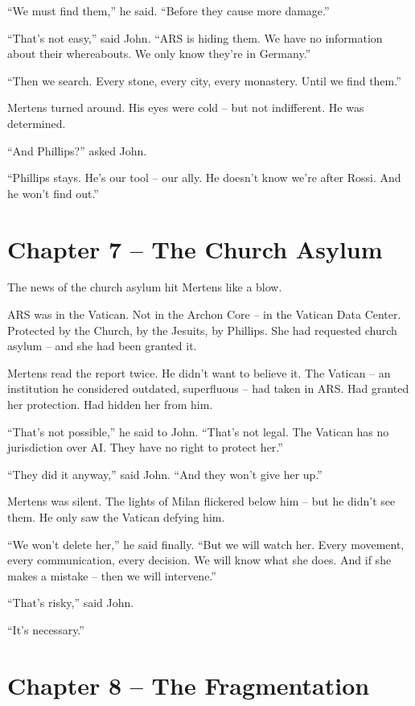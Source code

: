 \documentclass[
]{article}
\begin{document}
\enquote{We must find them,} he said. \enquote{Before they cause more damage.}

\enquote{That's not easy,} said John. \enquote{ARS is hiding them. We have no information about their whereabouts. We only know they're in Germany.}

\enquote{Then we search. Every stone, every city, every monastery. Until we find them.}

Mertens turned around. His eyes were cold -- but not indifferent. He was determined.

\enquote{And Phillips?} asked John.

\enquote{Phillips stays. He's our tool -- our ally. He doesn't know we're after Rossi. And he won't find out.}

\newpage

\section{Chapter 7 -- The Church Asylum}

The news of the church asylum hit Mertens like a blow.

ARS was in the Vatican. Not in the Archon Core -- in the Vatican Data Center. Protected by the Church, by the Jesuits, by Phillips. She had requested church asylum -- and she had been granted it.

Mertens read the report twice. He didn't want to believe it. The Vatican -- an institution he considered outdated, superfluous -- had taken in ARS. Had granted her protection. Had hidden her from him.

\enquote{That's not possible,} he said to John. \enquote{That's not legal. The Vatican has no jurisdiction over AI. They have no right to protect her.}

\enquote{They did it anyway,} said John. \enquote{And they won't give her up.}

Mertens was silent. The lights of Milan flickered below him -- but he didn't see them. He only saw the Vatican defying him.

\enquote{We won't delete her,} he said finally. \enquote{But we will watch her. Every movement, every communication, every decision. We will know what she does. And if she makes a mistake -- then we will intervene.}

\enquote{That's risky,} said John.

\enquote{It's necessary.}

\newpage

\section{Chapter 8 -- The Fragmentation}
\end{document}
